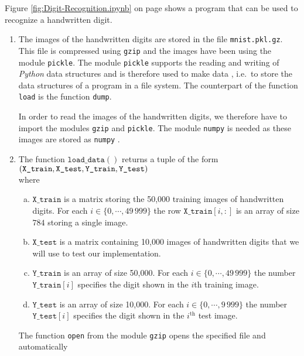\noindent
Figure \ref{fig:Digit-Recognition.ipynb} on page \pageref{fig:Digit-Recognition.ipynb} shows a program that can
be used to recognize a handwritten digit.
\begin{enumerate}
\item The images of the handwritten digits are stored in the file \texttt{mnist.pkl.gz}.  This file is compressed
      using \texttt{gzip} and the images have been  using the module
      \texttt{pickle}.  The module
      \texttt{pickle} supports the reading and writing of \textsl{Python} data structures and is therefore
      used to make data , i.e.~to store the data structures of a program in a file system.
      The counterpart of the function \texttt{load} is the function \texttt{dump}.

      In order to read the images of the handwritten digits, we therefore have to import the modules
      \texttt{gzip} and \texttt{pickle}.  The module \texttt{numpy} is needed as these images are stored as
      \texttt{numpy} .  
\item The function $\texttt{load\_data}()$ returns a tuple of the form
      \\[0.2cm]
      \hspace*{1.3cm}
      $ \displaystyle (\texttt{X\_train}, \texttt{X\_test}, \texttt{Y\_train}, \texttt{Y\_test}) $
      \\[0.2cm]
      where 
      \begin{enumerate}[(a)]
      \item $\texttt{X\_train}$ is a matrix storing the 50,000 training images of handwritten digits.
            For each $i \in \{0,\cdots,49\,999\}$ the row $\texttt{X\_train}[i, :]$ is an array of size $784$ storing a single image.
      \item $\texttt{X\_test}$ is a matrix containing 10,000 images of handwritten digits that we will use to
            test our implementation.
      \item $\texttt{Y\_train}$ is an array of size 50,000. For each $i \in \{0,\cdots,49\,999\}$ the number $\texttt{Y\_train}[i]$
            specifies the digit shown in the $i$th training image.
      \item $\texttt{Y\_test}$ is an array of size 10,000. For each $i \in \{0,\cdots,9\,999\}$ the number $\texttt{Y\_test}[i]$
            specifies the digit shown in the $i^{\mathrm{th}}$ test image.
      \end{enumerate}
      The function \texttt{open} from the module \texttt{gzip} opens the specified file and automatically

\end{enumerate}
